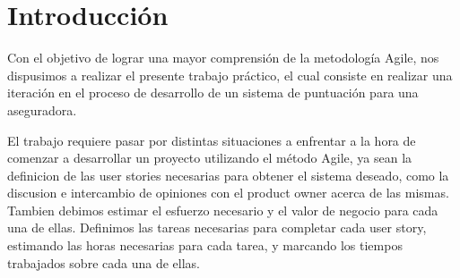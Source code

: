 \section{Introducción}

Con el objetivo de lograr una mayor comprensión de la metodología Agile, nos dispusimos a realizar el presente trabajo práctico, el cual consiste en realizar una iteración en el proceso de desarrollo de un sistema de puntuación para una aseguradora.

El trabajo requiere pasar por distintas situaciones a enfrentar a la hora de comenzar a desarrollar un proyecto utilizando el método Agile, ya sean la definicion de las user stories necesarias para obtener el sistema deseado, como la discusion e intercambio de opiniones con el product owner acerca de las mismas. Tambien debimos estimar el esfuerzo necesario y el valor de negocio para cada una de ellas. Definimos las tareas necesarias para completar cada user story, estimando las horas necesarias para cada tarea, y marcando los tiempos trabajados sobre cada una de ellas.


